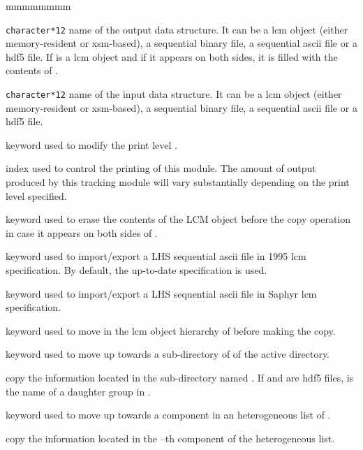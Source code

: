 \begin{ListeDeDescription}{mmmmmmmm}

\item[\dusa{NAME1}] {\tt character*12} name of the output data
structure. It can be a {\sc lcm} object (either memory-resident or {\sc xsm}-based), a sequential binary file,
a sequential {\sc ascii} file or a {\sc hdf5} file. If  is a {\sc lcm} object and if it appears on both sides,
it is filled with the contents of .

\item[\dusa{NAME2}] {\tt character*12} name of the input data
structure. It can be a {\sc lcm} object (either memory-resident or {\sc xsm}-based), a sequential binary file,
a sequential {\sc ascii} file or a {\sc hdf5} file.

\item[\moc{EDIT}] keyword used to modify the print level .

\item[\dusa{iprint}] index used to control the printing of this module. The
amount of output produced by this tracking module will vary substantially
depending on the print level specified.

\item[\moc{ERAS}] keyword used to erase the contents of the LCM object  before the copy operation in case it appears on both sides of \moc{:=}.

\item[\moc{OLD}] keyword used to import/export a LHS sequential {\sc ascii} file in 1995 {\sc lcm} specification. By
default, the up-to-date specification is used.

\item[\moc{SAP}] keyword used to import/export a LHS sequential {\sc ascii} file in Saphyr {\sc lcm} specification.

\item[\moc{STEP}] keyword used to move in the {\sc lcm} object hierarchy of  before making the copy.

\item[\moc{UP}] keyword used to move up towards a sub-directory of  of the
active directory.

\item[\dusa{NOMDIR}] copy the information located in the sub-directory named . If  and  are
{\sc hdf5} files,  is the name of a daughter group in .

\item[\moc{AT}] keyword used to move up towards a component in an heterogeneous list of .

\item[\dusa{index}] copy the information located in the --th component of the heterogeneous list.

\end{ListeDeDescription}

